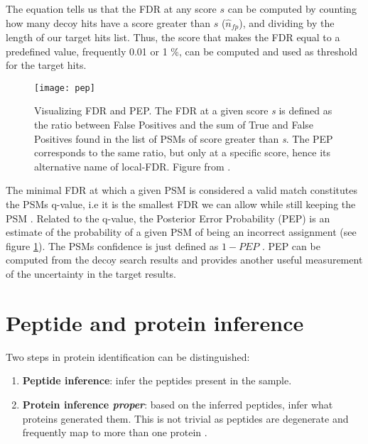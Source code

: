 The equation tells us that the FDR at any score $s$ can be computed by counting how many decoy hits have a score greater than $s$ ($\hat{n}_{fp}$), and dividing by the length of our target hits list. Thus, the score that makes the FDR equal to a predefined value, frequently 0.01 or 1 \%, can be computed and used as threshold for the target hits.

\begin{figure}[!h]
\centering
\texttt{[image: pep]}
\caption[FDR and PEP]{Visualizing FDR and PEP. The FDR at a given score \textit{s} is defined as the ratio between False Positives and the sum of True and False Positives found in the list of PSMs of score greater than \textit{s}. The PEP corresponds to the same ratio, but only at a specific score, hence its alternative name of local-FDR. Figure from \cite{Kall2008}.}
\label{fig:pep}
\end{figure}


The minimal FDR at which a given PSM is considered a valid match constitutes the PSM\textquotesingle s q-value, i.e it is the smallest FDR we can allow while still keeping the PSM \cite{Nesvizhskii2010}. Related to the q-value, the Posterior Error Probability (PEP) is an estimate of the probability of a given PSM of being an incorrect assignment (see figure \ref{fig:pep}). The PSM\textquotesingle s confidence is just defined as $1-PEP$ \cite{Nesvizhskii2010}. PEP can be computed from the decoy search results and provides another useful measurement of the uncertainty in the target results.




\section{Peptide and protein inference}
\label{sec:inference}

Two steps in protein identification can be distinguished:

\begin{enumerate}

\item \textbf{Peptide inference}: infer the peptides present in the sample.
\item \textbf{Protein inference \textit{proper}}: based on the inferred peptides, infer what proteins generated them. This is not trivial as peptides are degenerate and frequently map to more than one protein \cite{Li2012}.
\end{enumerate}

